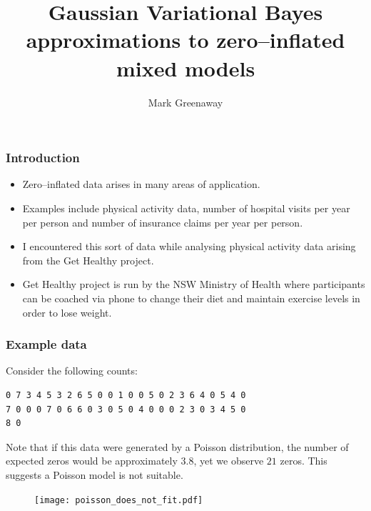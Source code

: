 \documentclass{beamer}
\title{Gaussian Variational Bayes approximations to zero--inflated mixed models}
\author{Mark Greenaway}
\begin{document}
\begin{frame}
	\titlepage
\end{frame}

\begin{frame}
	\frametitle{Introduction}
	\begin{itemize}
		\item Zero--inflated data arises in many areas of application.
		\item Examples include physical activity data, number of hospital
		      visits per year per person and number of insurance claims per year per person.
		\item I encountered this sort of data  while analysing physical
		      activity data arising from the Get Healthy project.
		\item Get Healthy project is run by the NSW Ministry of Health
		      where participants can be coached via phone to change their diet and maintain exercise levels in order
		      to lose weight.
	\end{itemize}		
\end{frame}

\begin{frame}[fragile]
	\frametitle{Example data}
	Consider the following counts:
	\begin{verbatim}
0 7 3 4 5 3 2 6 5 0 0 1 0 0 5 0 2 3 6 4 0 5 4 0
7 0 0 0 7 0 6 6 0 3 0 5 0 4 0 0 0 2 3 0 3 4 5 0
8 0
	\end{verbatim}
							
			
	\noindent Note that if this data were generated by a Poisson distribution, the number of expected
	zeros would be approximately $3.8$, yet we observe $21$ zeros. This suggests a Poisson model is not suitable.
							
	\begin{figure}
		\texttt{[image: poisson\_does\_not\_fit.pdf]}
	\end{figure}%
\end{frame}
\end{document}
